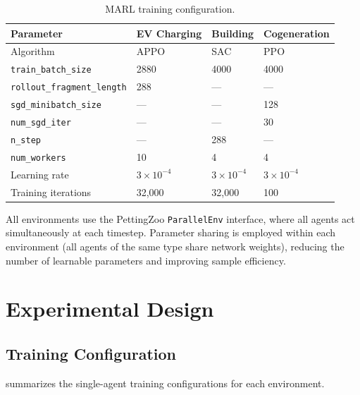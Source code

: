 \begin{table}[htbp]
\centering
\caption{MARL training configuration.}
\label{tab:marl_config}
\begin{tabular}{@{}llll@{}}
\toprule
\textbf{Parameter} & \textbf{EV Charging} & \textbf{Building} & \textbf{Cogeneration} \\
\midrule
Algorithm & APPO & SAC & PPO \\
\texttt{train\_batch\_size} & 2880 & 4000 & 4000 \\
\texttt{rollout\_fragment\_length} & 288 & --- & --- \\
\texttt{sgd\_minibatch\_size} & --- & --- & 128 \\
\texttt{num\_sgd\_iter} & --- & --- & 30 \\
\texttt{n\_step} & --- & 288 & --- \\
\texttt{num\_workers} & 10 & 4 & 4 \\
Learning rate & $3{\times}10^{-4}$ & $3{\times}10^{-4}$ & $3{\times}10^{-4}$ \\
Training iterations & 32,000 & 32,000 & 100 \\
\bottomrule
\end{tabular}
\end{table}

All environments use the PettingZoo \texttt{ParallelEnv} interface, where all agents act simultaneously at each timestep. Parameter sharing is employed within each environment (all agents of the same type share network weights), reducing the number of learnable parameters and improving sample efficiency.

\section{Experimental Design}
\label{sec:experimental_design}

\subsection{Training Configuration}
\label{sec:training_config}

 summarizes the single-agent training configurations for each environment.

